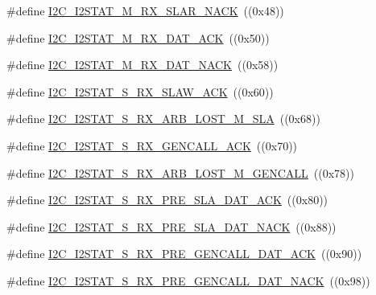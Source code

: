 \begin{DoxyCompactItemize}
\item 
\#define \hyperlink{group___i2_c___private___macros_gafe156febe3313a9f3423776f97d0f24f}{\-I2\-C\-\_\-\-I2\-S\-T\-A\-T\-\_\-\-M\-\_\-\-R\-X\-\_\-\-S\-L\-A\-R\-\_\-\-N\-A\-C\-K}~((0x48))
\item 
\#define \hyperlink{group___i2_c___private___macros_ga2f07d3cfad351ba3c976d629db20cea2}{\-I2\-C\-\_\-\-I2\-S\-T\-A\-T\-\_\-\-M\-\_\-\-R\-X\-\_\-\-D\-A\-T\-\_\-\-A\-C\-K}~((0x50))
\item 
\#define \hyperlink{group___i2_c___private___macros_ga9cc5203175775bfa5ae6df5d6d98b014}{\-I2\-C\-\_\-\-I2\-S\-T\-A\-T\-\_\-\-M\-\_\-\-R\-X\-\_\-\-D\-A\-T\-\_\-\-N\-A\-C\-K}~((0x58))
\item 
\#define \hyperlink{group___i2_c___private___macros_ga7055c4b55feda352df8016cbca0c270b}{\-I2\-C\-\_\-\-I2\-S\-T\-A\-T\-\_\-\-S\-\_\-\-R\-X\-\_\-\-S\-L\-A\-W\-\_\-\-A\-C\-K}~((0x60))
\item 
\#define \hyperlink{group___i2_c___private___macros_gaf13df6ed7d10be0e063bcbc04d329749}{\-I2\-C\-\_\-\-I2\-S\-T\-A\-T\-\_\-\-S\-\_\-\-R\-X\-\_\-\-A\-R\-B\-\_\-\-L\-O\-S\-T\-\_\-\-M\-\_\-\-S\-L\-A}~((0x68))
\item 
\#define \hyperlink{group___i2_c___private___macros_gadcab34e87ad115c011e23a5bd4fb8aa3}{\-I2\-C\-\_\-\-I2\-S\-T\-A\-T\-\_\-\-S\-\_\-\-R\-X\-\_\-\-G\-E\-N\-C\-A\-L\-L\-\_\-\-A\-C\-K}~((0x70))
\item 
\#define \hyperlink{group___i2_c___private___macros_ga1605c253472e071e7f77e51bda156ba7}{\-I2\-C\-\_\-\-I2\-S\-T\-A\-T\-\_\-\-S\-\_\-\-R\-X\-\_\-\-A\-R\-B\-\_\-\-L\-O\-S\-T\-\_\-\-M\-\_\-\-G\-E\-N\-C\-A\-L\-L}~((0x78))
\item 
\#define \hyperlink{group___i2_c___private___macros_ga4342227592c3e2e345517bd3e6cd8089}{\-I2\-C\-\_\-\-I2\-S\-T\-A\-T\-\_\-\-S\-\_\-\-R\-X\-\_\-\-P\-R\-E\-\_\-\-S\-L\-A\-\_\-\-D\-A\-T\-\_\-\-A\-C\-K}~((0x80))
\item 
\#define \hyperlink{group___i2_c___private___macros_gace56a90d55426cc6ab2a4ca540c63d02}{\-I2\-C\-\_\-\-I2\-S\-T\-A\-T\-\_\-\-S\-\_\-\-R\-X\-\_\-\-P\-R\-E\-\_\-\-S\-L\-A\-\_\-\-D\-A\-T\-\_\-\-N\-A\-C\-K}~((0x88))
\item 
\#define \hyperlink{group___i2_c___private___macros_ga75dd46ddb054c4d47a531b8e90f7f446}{\-I2\-C\-\_\-\-I2\-S\-T\-A\-T\-\_\-\-S\-\_\-\-R\-X\-\_\-\-P\-R\-E\-\_\-\-G\-E\-N\-C\-A\-L\-L\-\_\-\-D\-A\-T\-\_\-\-A\-C\-K}~((0x90))
\item 
\#define \hyperlink{group___i2_c___private___macros_ga20c65f8a82c18211127e5c335026bd76}{\-I2\-C\-\_\-\-I2\-S\-T\-A\-T\-\_\-\-S\-\_\-\-R\-X\-\_\-\-P\-R\-E\-\_\-\-G\-E\-N\-C\-A\-L\-L\-\_\-\-D\-A\-T\-\_\-\-N\-A\-C\-K}~((0x98))

\end{DoxyCompactItemize}
